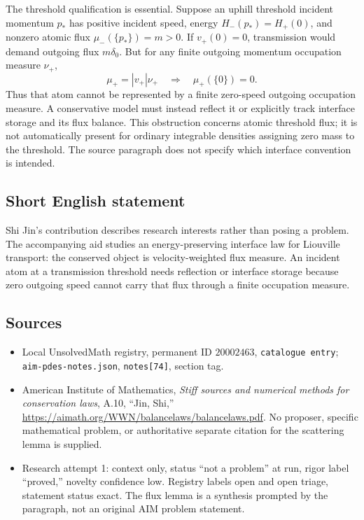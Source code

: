 \documentclass[11pt]{article}
\begin{document}
The threshold qualification is essential. Suppose an uphill threshold incident momentum $p_*$ has positive incident speed, energy $H_-(p_*)=H_+(0)$, and nonzero atomic flux $\mu_-(\{p_*\})=m>0$. If $v_+(0)=0$, transmission would demand outgoing flux $m\delta_0$. But for any finite outgoing momentum occupation measure $\nu_+$,
\[
\mu_+=|v_+|\nu_+\quad\Longrightarrow\quad\mu_+(\{0\})=0.
\]
Thus that atom cannot be represented by a finite zero-speed outgoing occupation measure. A conservative model must instead reflect it or explicitly track interface storage and its flux balance. This obstruction concerns atomic threshold flux; it is not automatically present for ordinary integrable densities assigning zero mass to the threshold. The source paragraph does not specify which interface convention is intended.
\subsection{Short English statement}
Shi Jin's contribution describes research interests rather than posing a problem. The accompanying aid studies an energy-preserving interface law for Liouville transport: the conserved object is velocity-weighted flux measure. An incident atom at a transmission threshold needs reflection or interface storage because zero outgoing speed cannot carry that flux through a finite occupation measure.
\subsection{Sources}
\begin{itemize}
\item Local UnsolvedMath registry, permanent ID $20002463$, \texttt{catalogue entry}; \texttt{aim-pdes-notes.json}, \texttt{notes[74]}, section tag.
\item American Institute of Mathematics, \emph{Stiff sources and numerical methods for conservation laws}, A.10, ``Jin, Shi,'' \url{https://aimath.org/WWN/balancelaws/balancelaws.pdf}. No proposer, specific mathematical problem, or authoritative separate citation for the scattering lemma is supplied.
\item Research attempt 1: context only, status ``not a problem'' at run, rigor label ``proved,'' novelty confidence low. Registry labels open and open triage, statement status exact. The flux lemma is a synthesis prompted by the paragraph, not an original AIM problem statement.
\end{itemize}
\end{document}
